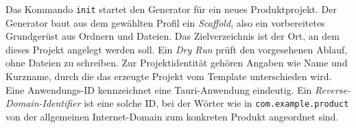 \begin{beginnerstatement}

Das Kommando \texttt{init} startet den Generator für ein neues
Produktprojekt. Der Generator baut aus dem gewählten Profil ein
\emph{Scaffold}, also ein vorbereitetes Grundgerüst aus Ordnern und Dateien.
Das Zielverzeichnis ist der Ort, an dem dieses Projekt angelegt werden soll.
Ein \emph{Dry Run} prüft den vorgesehenen Ablauf, ohne Dateien zu schreiben. Zur
Projektidentität gehören Angaben wie Name und Kurzname, durch die das erzeugte
Projekt vom Template unterschieden wird. Eine Anwendungs-ID kennzeichnet eine
Tauri-Anwendung eindeutig. Ein \emph{Reverse-Domain-Identifier} ist eine solche
ID, bei der Wörter wie in \texttt{com.example.product} von der allgemeinen
Internet-Domain zum konkreten Produkt angeordnet sind.

\end{beginnerstatement}
